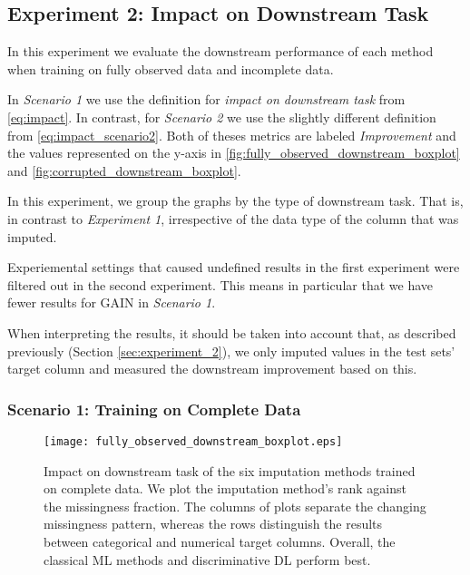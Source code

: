 \subsection{Experiment 2: Impact on Downstream Task}

In this experiment we evaluate the downstream performance of each method when training on fully observed data and incomplete data.

In \textit{Scenario 1} we use the definition for \textit{impact on downstream task} from \autoref{eq:impact}. In contrast, for \textit{Scenario 2} we use the slightly different definition from \autoref{eq:impact_scenario2}. Both of theses metrics are labeled \textit{Improvement} and the values represented on the y-axis in \autoref{fig:fully_observed_downstream_boxplot} and \autoref{fig:corrupted_downstream_boxplot}. 

In this experiment, we group the graphs by the type of downstream task. That is, in contrast to \textit{Experiment 1}, irrespective of the data type of the column that was imputed.

Experiemental settings that caused undefined results in the first experiment were filtered out in the second experiment. This means in particular that we have fewer results for GAIN in \textit{Scenario 1}.

When interpreting the results, it should be taken into account that, as described previously (Section \ref{sec:experiment_2}), we only imputed values in the test sets’ target column  and measured the downstream improvement based on this.


\subsubsection{Scenario 1: Training on Complete Data}


\begin{figure}\centering
	\texttt{[image: fully\_observed\_downstream\_boxplot.eps]}

	\caption[Downstream Ranks - Fully Observed]{Impact on downstream task of the six imputation methods trained on complete data. We plot the imputation method's rank against the missingness fraction. The columns of plots separate the changing missingness pattern, whereas the rows distinguish the results between categorical and numerical target columns. Overall, the classical ML methods and discriminative DL perform best.
    }
	\label{fig:fully_observed_downstream_boxplot}
\end{figure}

